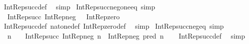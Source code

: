 \begin{isabellebody}
%
\isatagproof
{}\isamarkupfalse%
\ Int{\isacharunderscore}{\kern0pt}Rep{\isacharunderscore}{\kern0pt}succ{\isacharunderscore}{\kern0pt}def\ \isamarkupfalse%
\ simp%
\endisatagproof
{\isafoldproof}%
%
\isadelimproof
\isanewline
%
\endisadelimproof
\isanewline
{}\isamarkupfalse%
\ Int{\isacharunderscore}{\kern0pt}Rep{\isacharunderscore}{\kern0pt}succ{\isacharunderscore}{\kern0pt}neg{\isacharunderscore}{\kern0pt}one{\isacharunderscore}{\kern0pt}eq\ {\isacharbrackleft}{\kern0pt}simp{\isacharbrackright}{\kern0pt}{\isacharcolon}{\kern0pt}\isanewline
\ \ {\isachardoublequoteopen}Int{\isacharunderscore}{\kern0pt}Rep{\isacharunderscore}{\kern0pt}succ\ {\isacharparenleft}{\kern0pt}Int{\isacharunderscore}{\kern0pt}Rep{\isacharunderscore}{\kern0pt}neg\ {}{\isacharparenright}{\kern0pt}\ {\isacharequal}{\kern0pt}\ Int{\isacharunderscore}{\kern0pt}Rep{\isacharunderscore}{\kern0pt}zero{\isachardoublequoteclose}\isanewline
%
\isadelimproof
\ \ %
\endisadelimproof
%
\isatagproof
{}\isamarkupfalse%
\ Int{\isacharunderscore}{\kern0pt}Rep{\isacharunderscore}{\kern0pt}succ{\isacharunderscore}{\kern0pt}def\ nat{\isacharunderscore}{\kern0pt}one{\isacharunderscore}{\kern0pt}def\ Int{\isacharunderscore}{\kern0pt}Rep{\isacharunderscore}{\kern0pt}zero{\isacharunderscore}{\kern0pt}def\ \isamarkupfalse%
\ simp%
\endisatagproof
{\isafoldproof}%
%
\isadelimproof
\isanewline
%
\endisadelimproof
\isanewline
{}\isamarkupfalse%
\ Int{\isacharunderscore}{\kern0pt}Rep{\isacharunderscore}{\kern0pt}succ{\isacharunderscore}{\kern0pt}neg{\isacharunderscore}{\kern0pt}eq\ {\isacharbrackleft}{\kern0pt}simp{\isacharbrackright}{\kern0pt}{\isacharcolon}{\kern0pt}\isanewline
\ \ {\isachardoublequoteopen}n\ {\isasymnoteq}\ {}\ {\isasymLongrightarrow}\ Int{\isacharunderscore}{\kern0pt}Rep{\isacharunderscore}{\kern0pt}succ\ {\isacharparenleft}{\kern0pt}Int{\isacharunderscore}{\kern0pt}Rep{\isacharunderscore}{\kern0pt}neg\ n{\isacharparenright}{\kern0pt}\ {\isacharequal}{\kern0pt}\ Int{\isacharunderscore}{\kern0pt}Rep{\isacharunderscore}{\kern0pt}neg\ {\isacharparenleft}{\kern0pt}pred\ n{\isacharparenright}{\kern0pt}{\isachardoublequoteclose}\isanewline
%
\isadelimproof
\ \ %
\endisadelimproof
%
\isatagproof
{}\isamarkupfalse%
\ Int{\isacharunderscore}{\kern0pt}Rep{\isacharunderscore}{\kern0pt}succ{\isacharunderscore}{\kern0pt}def\ \isamarkupfalse%
\ simp%
\endisatagproof
{\isafoldproof}%
%
\isadelimproof
\isanewline
%
\endisadelimproof
\isanewline

\end{isabellebody}
